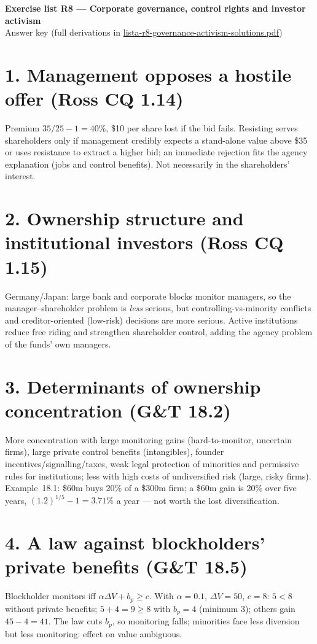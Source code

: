 \documentclass[11pt,a4paper]{article}
\begin{document}
\begin{center}{\Large\bfseries Exercise list R8 --- Corporate governance, control rights and investor activism}\\[4pt]{\large Answer key (full derivations in \url{lista-r8-governance-activism-solutions.pdf})}\end{center}

\section*{1. Management opposes a hostile offer (Ross CQ 1.14)}
Premium $35/25-1=40\%$, \$10 per share lost if the bid fails. Resisting serves shareholders only if
management credibly expects a stand-alone value above \$35 or uses resistance to extract a higher bid;
an immediate rejection fits the agency explanation (jobs and control benefits). Not necessarily in the
shareholders' interest.

\section*{2. Ownership structure and institutional investors (Ross CQ 1.15)}
Germany/Japan: large bank and corporate blocks monitor managers, so the manager--shareholder problem
is \emph{less} serious, but controlling-vs-minority conflicts and creditor-oriented (low-risk)
decisions are more serious. Active institutions reduce free riding and strengthen shareholder control,
adding the agency problem of the funds' own managers.

\section*{3. Determinants of ownership concentration (G\&T 18.2)}
More concentration with large monitoring gains (hard-to-monitor, uncertain firms), large private
control benefits (intangibles), founder incentives/signalling/taxes, weak legal protection of minorities
and permissive rules for institutions; less with high costs of undiversified risk (large, risky firms).
Example~18.1: \$60m buys 20\% of a \$300m firm; a \$60m gain is 20\% over five years,
$(1.2)^{1/5}-1=3.71\%$ a year --- not worth the lost diversification.

\section*{4. A law against blockholders' private benefits (G\&T 18.5)}
Blockholder monitors iff $\alpha\Delta V+b_p\ge c$. With $\alpha=0.1$, $\Delta V=50$, $c=8$: $5<8$
without private benefits; $5+4=9\ge8$ with $b_p=4$ (minimum $3$); others gain $45-4=41$. The law cuts
$b_p$, so monitoring falls; minorities face less diversion but less monitoring: effect on value ambiguous.
\end{document}
